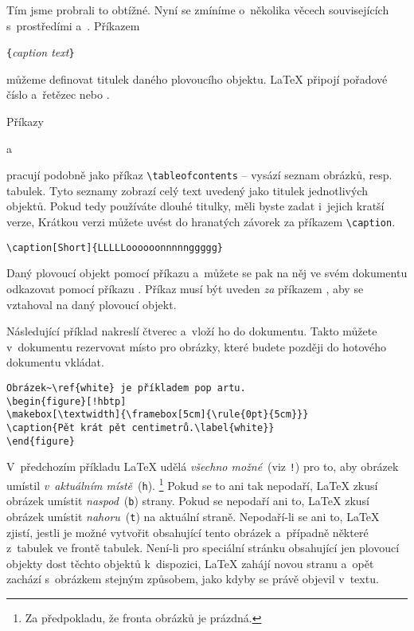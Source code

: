 \bigskip
\noindent Tím jsme probrali to obtížné. Nyní se zmíníme o~několika
věcech souvisejících s~prostředími  a~.
Příkazem

\begin{lscommand}
\verb|{|\emph{caption text}\verb|}|
\end{lscommand}

\noindent můžeme definovat titulek daného plovoucího objektu. \LaTeX{}
připojí pořadové číslo a~řetězec  nebo .

Příkazy

\begin{lscommand}
 a~ 
\end{lscommand}

\noindent pracují podobně jako příkaz \verb|\tableofcontents| --
vysází seznam obrázků, resp. tabulek. Tyto seznamy zobrazí celý
text uvedený jako titulek jednotlivých objektů. Pokud tedy
používáte dlouhé titulky, měli byste zadat i~jejich kratší verze,
Krátkou verzi můžete uvést do hranatých závorek za příkazem
\verb|\caption|.
\begin{code}
\verb|\caption[Short]{LLLLLoooooonnnnnggggg}| 
\end{code}

Daný plovoucí objekt  pomocí příkazu 
a~můžete se pak na něj ve svém dokumentu odkazovat pomocí příkazu
. Příkaz  musí být uveden \emph{za} příkazem ,
aby se vztahoval na daný plovoucí objekt.

Následující příklad nakreslí čtverec a~vloží ho do dokumentu. Takto
můžete v~dokumentu rezervovat místo pro obrázky, které budete později
do hotového dokumentu vkládat.

\begin{code}
\begin{verbatim}
Obrázek~\ref{white} je příkladem pop artu.
\begin{figure}[!hbtp]
\makebox[\textwidth]{\framebox[5cm]{\rule{0pt}{5cm}}}
\caption{Pět krát pět centimetrů.\label{white}}
\end{figure}
\end{verbatim}
\end{code}

\noindent V~předchozím příkladu \LaTeX{} udělá \emph{všechno možné}~(viz \texttt{!})
pro to, aby obrázek umístil \emph{v~aktuálním místě}~(\texttt{h}).%
\footnote{Za předpokladu, že fronta obrázků je prázdná.} Pokud se to ani tak nepodaří,
\LaTeX{} zkusí obrázek umístit \emph{naspod}~(\texttt{b}) strany.
Pokud se nepodaří ani to, \LaTeX{} zkusí obrázek umístit
\emph{nahoru}~(\texttt{t}) na aktuální straně. Nepodaří-li se ani to,
\LaTeX{} zjistí, jestli je možné vytvořit 
obsahující tento obrázek a~případně některé z~tabulek ve frontě
tabulek. Není-li pro speciální stránku obsahující jen plovoucí
objekty dost těchto objektů k~dispozici, \LaTeX{} zahájí novou stranu a~opět zachází
s~obrázkem stejným způsobem, jako kdyby se právě objevil v~textu.

